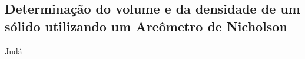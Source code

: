 \subsection{Determinação do volume e da densidade de um sólido
utilizando um Areômetro de Nicholson}

Judá
